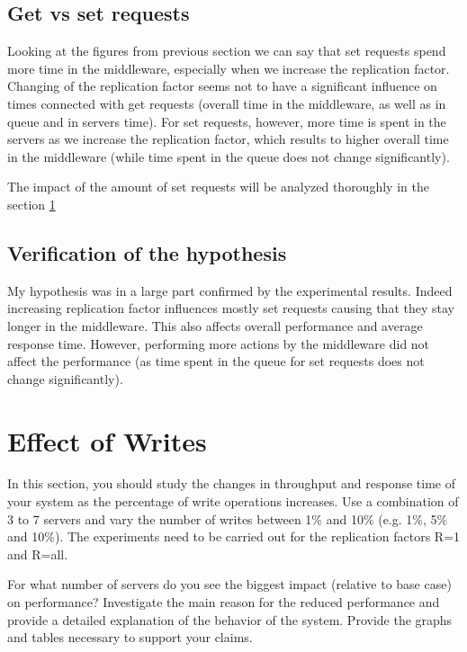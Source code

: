 \documentclass[11pt]{article}
\begin{document}
\subsection{Get vs set requests}

Looking at the figures from previous section we can say that set requests spend more time in the middleware, especially when we increase the replication factor. Changing of the replication factor seems not to have a significant influence on times connected with get requests (overall time in the middleware, as well as in queue and in servers time). For set requests, however, more time is spent in the servers as we increase the replication factor, which results to higher overall time in the middleware (while time spent in the queue does not change significantly).

The impact of the amount of set requests will be analyzed thoroughly in the section \ref{sec:writes}

\subsection{Verification of the hypothesis}
My hypothesis was in a large part confirmed by the experimental results. Indeed increasing replication factor influences mostly set requests causing that they stay longer in the middleware. This also affects overall performance and average response time. However, performing more actions by the middleware did not affect the performance (as time spent in the queue for set requests does not change significantly).


\pagebreak


\section{Effect of Writes}
\label{sec:writes}

In this section, you should study the changes in throughput and response time of your system as the percentage of write operations increases. Use a combination of 3 to 7 servers and vary the number of writes between 1\% and 10\% (e.g. 1\%, 5\% and 10\%). The experiments need to be carried out for the replication factors R=1 and R=all.  

For what number of servers do you see the biggest impact (relative to base case) on performance? Investigate the main reason for the reduced performance and provide a detailed explanation of the behavior of the system. Provide the graphs and tables necessary to support your claims.
\end{document}
